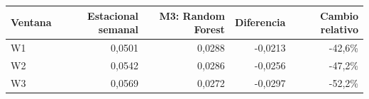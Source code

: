 \begin{tabular}{lrrrr}
\toprule
Ventana & Estacional semanal & M3: Random Forest & Diferencia & Cambio relativo \\
\midrule
W1 & 0{,}0501 & 0{,}0288 & -0{,}0213 & -42{,}6\% \\
W2 & 0{,}0542 & 0{,}0286 & -0{,}0256 & -47{,}2\% \\
W3 & 0{,}0569 & 0{,}0272 & -0{,}0297 & -52{,}2\% \\
\bottomrule
\end{tabular}